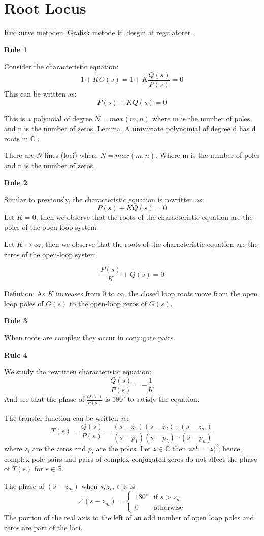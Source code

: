 \section{Root Locus}
Rudkurve metoden.
Grafisk metode til desgin af regulatorer.

\textbf{Rule 1}

Consider the characteristic equation:
$$ 1+KG(s) = 1 + K\frac{Q(s)}{P(s)} = 0$$
This can be written as:
$$P(s) + KQ(s) = 0$$

This is a polynoial of degree $N = max(m,n)$ where m is the number of poles and n is the number of zeros.
Lemma. A univariate polynomial of degree d has d roots in $\mathbb{C}$ .

There are $N$ lines (loci) where $N=max(m,n)$. Where m is the number of poles and n is the number of zeros.

\textbf{Rule 2}

Similar to previously, the characteristic equation is rewritten as:
$$P(s) + KQ(s) = 0$$
Let $K=0$, then we observe that the roots of the characteristic equation are the poles of
the open-loop system.

Let $K\to \infty$, then we observe that the roots of the characteristic equation are the zeros of
the open-loop system.

$$\frac{P(s)}{K} + Q(s) = 0$$

Defintion: As $K$ increases from 0 to $\infty$, the closed loop roots move from the open loop poles of $G(s)$
to the open-loop zeros of $G(s)$.

\textbf{Rule 3}

When roots are complex they occur in conjugate pairs.

\textbf{Rule 4}

We study the rewritten characteristic equation:
$$\frac{Q(s)}{P(s)} = -\frac{1}{K}$$
And see that the phase of $\frac{Q(s)}{P(s)}$ is $180^\circ$ to satisfy the equation.

The transfer function can be written as:
$$T(s) = \frac{Q(s)}{P(s)} = \frac{(s-z_1)(s-z_2)\cdots(s-z_m)}{(s-p_1)(s-p_2)\cdots(s-p_n)}$$
where $z_i$ are the zeros and $p_i$ are the poles.
Let $z \in \mathbb{C}$ then $zz* = |z|^2$; hence, complex pole pairs and pairs of complex
conjugated zeros do not affect the phase of $T(s)$ for $s \in \mathbb{R}$.

The phase of $(s-z_m)$ when $s,z_m \in \mathbb{R}$ is
\begin{equation}
	\angle(s-z_m) =
	\begin{cases}
		180^\circ & \text{if } s > z_m \\
		0^\circ   & \text{otherwise}
	\end{cases}
\end{equation}
The portion of the real axis to the left of an odd number of open loop poles and zeros
are part of the loci.

